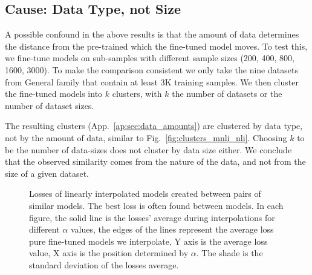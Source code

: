 \documentclass[nohyperref]{article}
\theoremstyle{plain}
\theoremstyle{definition}
\theoremstyle{remark}
\begin{document}
\subsection{Cause: Data Type, not Size}\label{sec:data_amounts}
A possible confound in the above results is that the amount of data determines the distance from the pre-trained which the fine-tuned model moves.
To test this, we fine-tune models on sub-samples with different sample sizes (200, 400, 800, 1600, 3000).
To make the comparison consistent we only take the nine datasets from General family that contain at least 3K training samples.
We then cluster the fine-tuned models into $k$ clusters, with $k$ the number of datasets or the number of dataset sizes.

The resulting clusters (App.~\ref{ap:sec:data_amounts}) are clustered by data type, not by the amount of data, similar to Fig.~\ref{fig:clusters_mnli_nli}. Choosing $k$ to be the number of data-sizes does not cluster by data size either. 
We conclude that the observed similarity comes from the nature of the data, and not from the size of a given dataset. 


\begin{figure*}[t]
\hfill
{}
\hfill
{}
\caption{Losses of linearly interpolated models created between pairs of similar models. The best loss is often found between models. In each figure, the solid line is the losses' average during interpolations for different $ \alpha $ values, the edges of the lines represent the average loss pure fine-tuned models we interpolate, Y axis is the average loss value, X axis is the position determined by $\alpha$. The shade is the standard deviation of the losses average. 
\label{fig:interpolation_all_granular_levels}}
\end{figure*}
\end{document}
